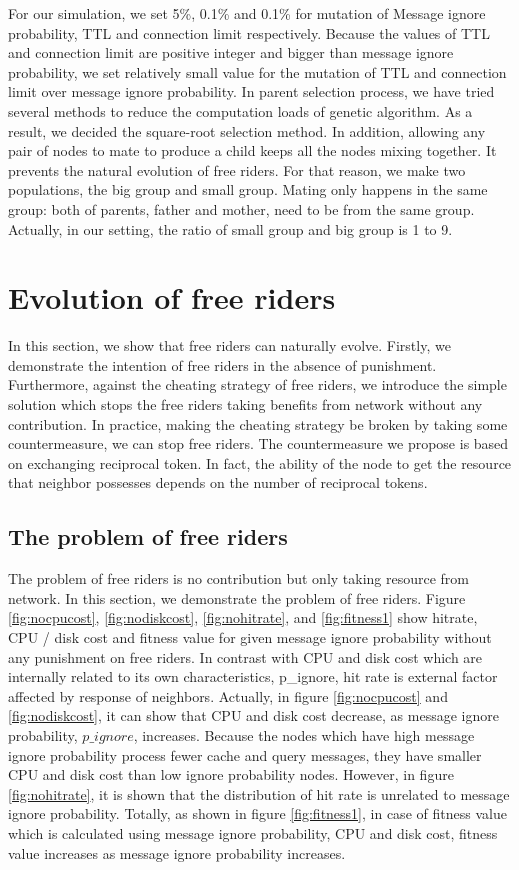 \documentclass[12pt,journal,draftcls,letterpaper,onecolumn]{IEEEtran}
\begin{document}
For our simulation, we set 5\%, 0.1\% and 0.1\% for mutation of Message ignore probability,
TTL and connection limit respectively. Because the values of TTL and connection limit are
positive integer and bigger than message ignore probability, we set relatively small value for
the mutation of TTL and connection limit over message ignore probability. In parent selection
process, we have tried several methods to reduce the computation loads of genetic algorithm.
As a result, we decided the square-root selection method\cite{genetic}. In addition, allowing any pair of
nodes to mate to produce a child keeps all the nodes mixing together. It prevents the natural
evolution of free riders. For that reason, we make two populations, the big group and small
group. Mating only happens in the same group: both of parents, father and mother, need to be
from the same group. Actually, in our setting, the ratio of small group and big group is 1 to 9.

\section{Evolution of free riders}\label{sec:evolution}
In this section, we show that free riders can naturally evolve. Firstly, we demonstrate the
intention of free riders in the absence of punishment. Furthermore, against the cheating
strategy of free riders, we introduce the simple solution which stops the free riders taking
benefits from network without any contribution. In practice, making the cheating strategy be
broken by taking some countermeasure, we can stop free riders. The countermeasure we
propose is based on exchanging reciprocal token. In fact, the ability of the node to get the
resource that neighbor possesses depends on the number of reciprocal tokens.

\subsection{The problem of free riders}\label{sec:problem}
The problem of free riders is no contribution but only taking resource from network. 
In this section, we demonstrate the problem of free riders. Figure \ref{fig:nocpucost}, \ref{fig:nodiskcost}, 
\ref{fig:nohitrate}, and \ref{fig:fitness1} show hitrate, CPU / disk cost and fitness value
for given message ignore probability without any punishment on free riders. In contrast with
CPU and disk cost which are internally related to its own characteristics, p\_ignore, hit rate is
external factor affected by response of neighbors. Actually, in figure \ref{fig:nocpucost} and \ref{fig:nodiskcost}, 
it can show that CPU and disk cost decrease, as message ignore probability, $p\_ignore$, increases. Because
the nodes which have high message ignore probability process fewer cache and query
messages, they have smaller CPU and disk cost than low ignore probability nodes. However, in
figure \ref{fig:nohitrate}, it is shown that the distribution of hit rate is unrelated to message ignore
probability. Totally, as shown in figure \ref{fig:fitness1}, in case of fitness value which is calculated using
message ignore probability, CPU and disk cost, fitness value increases as message ignore
probability increases.
\end{document}
